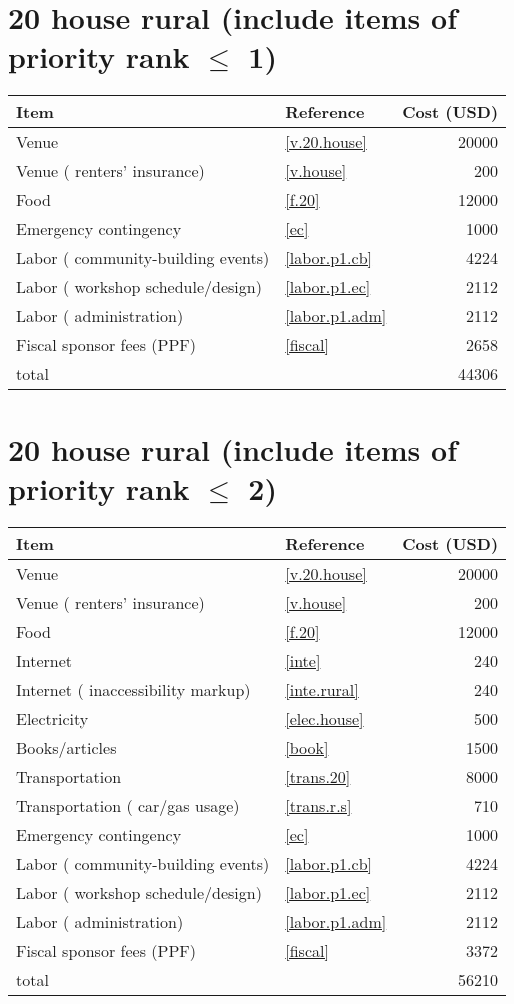 \section*{20 house rural (include items of priority rank $\leq$ 1)}
\begin{center}
\begin{tabular}{llr}
Item & Reference & Cost (USD) \\ \hline
Venue & \ref{v.20.house} & 20000 \\
Venue ( renters' insurance) & \ref{v.house} & 200 \\
Food & \ref{f.20} & 12000 \\
Emergency contingency & \ref{ec} & 1000 \\
Labor ( community-building events) & \ref{labor.p1.cb} & 4224 \\
Labor ( workshop schedule/design) & \ref{labor.p1.ec} & 2112 \\
Labor ( administration) & \ref{labor.p1.adm} & 2112 \\
Fiscal sponsor fees (PPF) & \ref{fiscal} & 2658 \\ \hline
total &  & 44306
\end{tabular}
\end{center}
\newpage
\section*{20 house rural (include items of priority rank $\leq$ 2)}
\begin{center}
\begin{tabular}{llr}
Item & Reference & Cost (USD) \\ \hline
Venue & \ref{v.20.house} & 20000 \\
Venue ( renters' insurance) & \ref{v.house} & 200 \\
Food & \ref{f.20} & 12000 \\
Internet & \ref{inte} & 240 \\
Internet ( inaccessibility markup) & \ref{inte.rural} & 240 \\
Electricity & \ref{elec.house} & 500 \\
Books/articles & \ref{book} & 1500 \\
Transportation & \ref{trans.20} & 8000 \\
Transportation ( car/gas usage) & \ref{trans.r.s} & 710 \\
Emergency contingency & \ref{ec} & 1000 \\
Labor ( community-building events) & \ref{labor.p1.cb} & 4224 \\
Labor ( workshop schedule/design) & \ref{labor.p1.ec} & 2112 \\
Labor ( administration) & \ref{labor.p1.adm} & 2112 \\
Fiscal sponsor fees (PPF) & \ref{fiscal} & 3372 \\ \hline
total &  & 56210
\end{tabular}
\end{center}
\newpage
